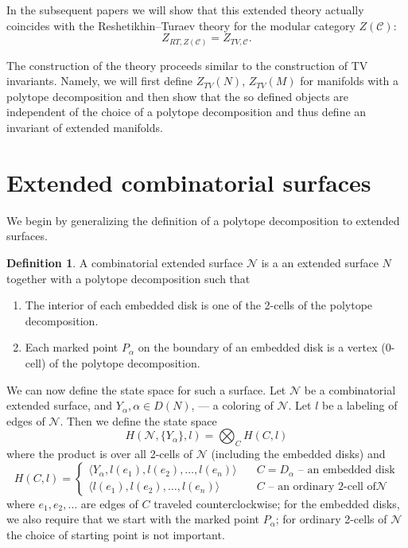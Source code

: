 \documentclass{amsart}
\theoremstyle{definition}
\newtheorem{definition}[theorem]{Definition}
\theoremstyle{remark}
\numberwithin{equation}{section}
\newcommand{\<}{\langle}
\renewcommand{\>}{\rangle}
\newcommand{\N}{\mathcal{N}}       %
\newcommand{\C}{\mathcal{C}}      %
\newcommand{\al}{\alpha}
\begin{document}
In the subsequent papers we will show that this  extended theory
actually coincides with the Reshetikhin--Turaev theory for the
modular category $Z(\C)$:
$$
Z_{RT, Z(\C)}=Z_{TV, \C}.
$$

The construction of the theory proceeds similar to the construction of TV
invariants. Namely, we will first define $Z_{TV}(N)$, $Z_{TV}(M)$ for
manifolds with a polytope decomposition and then show that the so defined
objects are independent of the choice of a polytope decomposition and
thus define an invariant of extended manifolds. 

\section{Extended combinatorial surfaces}\label{s:ext_surfaces}
We begin by generalizing the definition of a polytope decomposition to
extended surfaces.

\begin{definition}\label{d:comb_ex_surface}
    A  combinatorial extended surface $\N$ is a an extended surface $N$
  together with a  polytope decomposition such that
\begin{enumerate}
  \item The interior of each embedded disk is one of the 2-cells of the
    polytope decomposition.
  \item Each marked point $P_\al$ on the boundary of an embedded disk is a
    vertex (0-cell) of the polytope decomposition. 
\end{enumerate}
\end{definition}

We can now define the state space for such a surface. Let $\N$ be
a combinatorial extended surface, and $Y_\al, \al\in D(N)$, --- a
coloring of $\N$. Let $l$ be a labeling of edges of $\N$. Then we define
the state space
$$
H(\N, \{Y_\al\},l)=\bigotimes_C  H(C,l)
$$
where the product is over all 2-cells of $\N$ (including the embedded
disks) and
$$
H(C,l)=\begin{cases}
\<Y_\al,l(e_1), l(e_2),\dots, l(e_n)\>&\quad
                  C=D_\al \text{ -- an embedded disk}\\
\<l(e_1), l(e_2),\dots, l(e_n)\>&\quad C \text{ -- an ordinary 2-cell of
$\N$}
\end{cases}
$$
where $e_1,e_2,\dots$ are edges of $C$ traveled counterclockwise;
for the embedded disks, we also require that we start with the
marked point $P_\al$; for ordinary 2-cells of $\N$ the choice of starting
point is not important.
\end{document}
